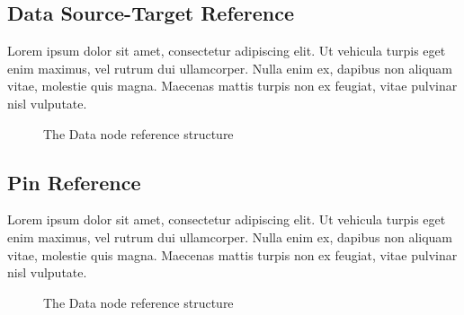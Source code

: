\subsection{Data Source-Target Reference}

Lorem ipsum dolor sit amet, consectetur adipiscing elit. Ut vehicula turpis eget enim maximus, vel rutrum dui ullamcorper. Nulla enim ex, dapibus non aliquam vitae, molestie quis magna. Maecenas mattis turpis non ex feugiat, vitae pulvinar nisl vulputate.

\begin{figure}[!ht]
	\centering
	
	\caption{The Data node reference structure}
	\label{fig:data_source_target_reference}
\end{figure}

\subsection{Pin Reference}

Lorem ipsum dolor sit amet, consectetur adipiscing elit. Ut vehicula turpis eget enim maximus, vel rutrum dui ullamcorper. Nulla enim ex, dapibus non aliquam vitae, molestie quis magna. Maecenas mattis turpis non ex feugiat, vitae pulvinar nisl vulputate.

\begin{figure}[!ht]
	\centering
	
	\caption{The Data node reference structure}
	\label{fig:pin_reference}
\end{figure}
